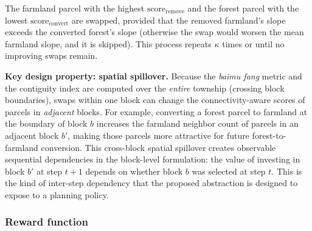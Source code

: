 \documentclass[preprint,12pt]{elsarticle}
\begin{document}
The farmland parcel with the highest $\text{score}_{\text{remove}}$ and the forest parcel with the lowest $\text{score}_{\text{convert}}$ are swapped, provided that the removed farmland's slope exceeds the converted forest's slope (otherwise the swap would worsen the mean farmland slope, and it is skipped). This process repeats $\kappa$ times or until no improving swaps remain.

\textbf{Key design property: spatial spillover.} Because the \textit{baimu fang} metric and the contiguity index are computed over the \textit{entire} township (crossing block boundaries), swaps within one block can change the connectivity-aware scores of parcels in \textit{adjacent} blocks. For example, converting a forest parcel to farmland at the boundary of block $b$ increases the farmland neighbor count of parcels in an adjacent block $b'$, making those parcels more attractive for future forest-to-farmland conversion. This cross-block spatial spillover creates observable sequential dependencies in the block-level formulation: the value of investing in block $b'$ at step $t+1$ depends on whether block $b$ was selected at step $t$. This is the kind of inter-step dependency that the proposed abstraction is designed to expose to a planning policy.

\subsubsection{Reward function}
\end{document}

